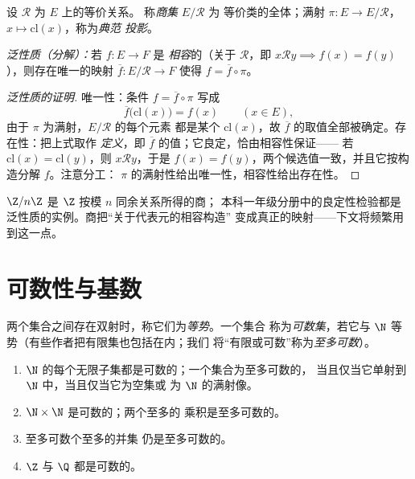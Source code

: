 \begin{definition}[商集]\label{def:b2:structures:quotient}
设 $\mathcal{R}$ 为 $E$ 上的等价关系。
称\emph{商集} $E/\mathcal{R}$ 为
等价类的全体；满射 $\pi \colon E \to E/\mathcal{R}$，
$x \mapsto \mathrm{cl}(x)$，称为\emph{典范
投影}。

\emph{泛性质（分解）：}若 $f \colon E \to F$ 是
\emph{相容}的（关于 $\mathcal{R}$，即 $x \mathbin{\mathcal{R}}
y \implies f(x) = f(y)$），则存在唯一的映射 $\overline f
\colon E/\mathcal{R} \to F$ 使得 $f = \overline f \circ \pi$。
\end{definition}

\begin{proof}[泛性质的证明]
唯一性：条件 $f = \overline f \circ \pi$ 写成
\[
\overline f\bigl(\mathrm{cl}(x)\bigr) = f(x)
\qquad (x \in E),
\]
由于 $\pi$ 为满射，$E/\mathcal{R}$ 的每个元素
都是某个 $\mathrm{cl}(x)$，故
$\overline f$ 的取值全部被确定。存在性：把上式取作
\emph{定义}，即 $\overline f$ 的值；它良定，恰由相容性保证——
若 $\mathrm{cl}(x) =
\mathrm{cl}(y)$，则 $x \mathbin{\mathcal{R}} y$，于是 $f(x) =
f(y)$，两个候选值一致，并且它按构造分解
$f$。注意分工：
$\pi$ 的满射性给出唯一性，相容性给出存在性。
\end{proof}

\begin{example}
$\Z/n\Z$ 是 $\Z$ 按模 $n$ 同余关系所得的商；
本科一年级分册中的良定性检验都是
泛性质的实例。商把“关于代表元的相容构造”
变成真正的映射——下文将频繁用到这一点。
\end{example}

\section{可数性与基数}

\begin{definition}[等势与可数性]\label{def:b2:structures:countable}
两个集合之间存在双射时，称它们为\emph{等势}。一个集合
称为\emph{可数集}，若它与
$\N$ 等势（有些作者把有限集也包括在内；我们
将“有限或可数”称为\emph{至多可数}）。
\end{definition}

\begin{proposition}[稳定性质]\label{prop:b2:structures:countablestable}
\begin{enumerate}
  \item $\N$ 的每个无限子集都是可数的；一个集合为至多可数的，
        当且仅当它单射到 $\N$ 中，当且仅当它为空集或
        为 $\N$ 的满射像。
  \item $\N \times \N$ 是可数的；两个至多的
        乘积是至多可数的。
  \item 至多可数个至多的并集
        仍是至多可数的。
  \item $\Z$ 与 $\Q$ 都是可数的。
\end{enumerate}
\end{proposition}

